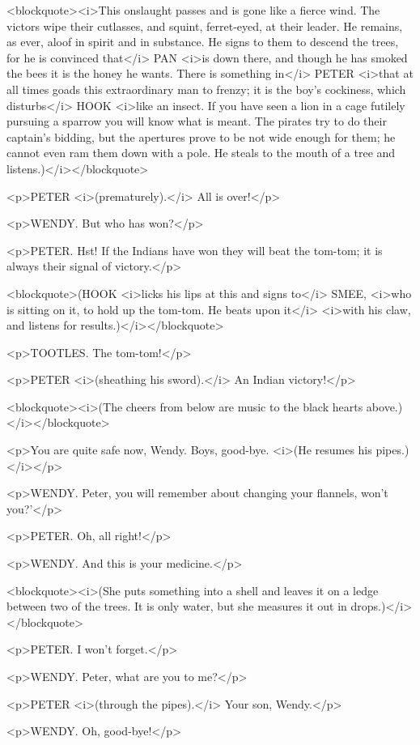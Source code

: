 <blockquote><i>This onslaught passes and is gone like a fierce wind.
The victors wipe their cutlasses, and squint, ferret-eyed, at their
leader. He remains, as ever, aloof in spirit and in substance. He
signs to them to descend the trees, for he is convinced that</i> PAN
<i>is down there, and though he has smoked the bees it is the honey
he wants. There is something in</i> PETER <i>that at all times goads
this extraordinary man to frenzy; it is the boy's cockiness, which
disturbs</i> HOOK <i>like an insect. If you have seen a lion in a
cage futilely pursuing a sparrow you will know what is meant. The
pirates try to do their captain's bidding, but the apertures prove to
be not wide enough for them; he cannot even ram them down with a
pole. He steals to the mouth of a tree and listens.)</i></blockquote>

<p>PETER <i>(prematurely).</i> All is over!</p>

<p>WENDY. But who has won?</p>

<p>PETER. Hst! If the Indians have won they will beat the tom-tom; it
is always their signal of victory.</p>

<blockquote>(HOOK <i>licks his lips at this and signs to</i> SMEE,
<i>who is sitting on it, to hold up the tom-tom. He beats upon it</i>
<i>with his claw, and listens for results.)</i></blockquote>

<p>TOOTLES. The tom-tom!</p>

<p>PETER <i>(sheathing his sword).</i> An Indian victory!</p>

<blockquote><i>(The cheers from below are music to the black hearts
above.)</i></blockquote>

<p>You are quite safe now, Wendy. Boys, good-bye. <i>(He resumes his
pipes.)</i></p>

<p>WENDY. Peter, you will remember about changing your flannels,
won't you?'</p>

<p>PETER. Oh, all right!</p>

<p>WENDY. And this is your medicine.</p>

<blockquote><i>(She puts something into a shell and leaves it on a
ledge between two of the trees. It is only water, but she measures it
out in drops.)</i></blockquote>

<p>PETER. I won't forget.</p>

<p>WENDY. Peter, what are you to me?</p>

<p>PETER <i>(through the pipes).</i> Your son, Wendy.</p>

<p>WENDY. Oh, good-bye!</p>

